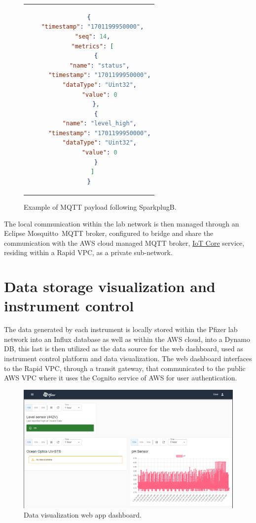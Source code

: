 \documentclass[10pt]{article}
\begin{document}
\begin{figure}[h]
\centering
\begin{tabular}{c}
\begin{lstlisting}[language=json,
				   basicstyle=\small]
{
  "timestamp": "1701199950000",
  "seq": 14,
  "metrics": [
    {
      "name": "status",
      "timestamp": "1701199950000",
      "dataType": "Uint32",
      "value": 0
    },
    {
      "name": "level_high",
      "timestamp": "1701199950000",
      "dataType": "Uint32",
      "value": 0
    }
  ]
}
\end{lstlisting}
\end{tabular}
\caption{Example of MQTT payload following Sparkplug\texttrademark B.}
\label{spark}
\end{figure}

The local communication within the lab network is then managed through 
an Eclipse Mosquitto\texttrademark\ MQTT broker, configured to bridge and 
share the communication with the AWS cloud managed MQTT broker, 
\href{https://aws.amazon.com/iot-core/?nc=sn&loc=0}{IoT Core} service, 
residing within a Rapid VPC, as a private sub-network.


\section*{Data storage visualization and instrument control}

The data generated by each instrument is locally stored within the Pfizer lab
network into an Influx database as well as within the AWS cloud,
into a Dynamo DB, this last is then utilized as the data source for
the web dashboard, used as instrument control platform and data visualization.
The web dashboard interfaces to the Rapid VPC, through a transit gateway,
that communicated to the public AWS VPC where it uses the Cognito service of
AWS for user authentication.

\begin{figure}[h]
\centering
\includegraphics[width=1\textwidth]{webapp_aws}
\caption{Data visualization web app dashboard.}
\label{webapp_aws}
\end{figure}
\end{document}
